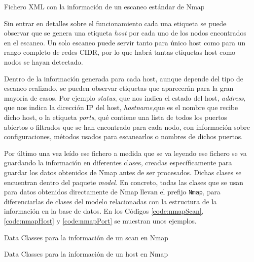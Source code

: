 \begin{listing}[H]
	\caption{Fichero XML con la información de un escaneo estándar de Nmap}
	
	\label{code:regular-scan}
\end{listing}

Sin entrar en detalles sobre el funcionamiento cada una etiqueta se puede observar que se genera una etiqueta \textit{host} por cada uno de los nodos encontrados en el escaneo. Un solo escaneo puede servir tanto para único host como para un rango completo de redes CIDR, por lo que habrá tantas etiquetas host como nodos se hayan detectado.

Dentro de la información generada para cada host, aunque depende del tipo de escaneo realizado, se pueden observar etiquetas que aparecerán para la gran mayoría de casos. Por ejemplo \textit{status}, que nos indica el estado del host, \textit{address}, que nos indica la dirección IP del host, \textit{hostname},que es el nombre que recibe dicho host, o la etiqueta \textit{ports}, qué contiene una lista de todos los puertos abiertos o filtrados que se han encontrado para cada nodo, con información sobre configuraciones, métodos usados para escanearlos o nombres de dichos puertos.

Por último una vez leído ese fichero a medida que se va leyendo ese fichero se va guardando la información en diferentes clases, creadas específicamente para guardar los datos obtenidos de Nmap antes de ser procesados. Dichas clases se encuentran dentro del paquete \textit{model}. En concreto, todas las clases que se usan para datos obtenidos directamente de Nmap llevan el prefijo \texttt{Nmap}, para diferenciarlas de clases del modelo relacionadas con la estructura de la información en la base de datos. En los Códigos \ref{code:nmapScan}, \ref{code:nmapHost} y \ref{code:nmapPort} se muestran unos ejemplos.

\begin{listing}[H]
	\caption{Data Classes para la información de un scan en Nmap}
	
	\label{code:nmapScan}
\end{listing}

\begin{listing}[H]
	\caption{Data Classes para la información de un host en Nmap}
	
	\label{code:nmapHost}
\end{listing}

